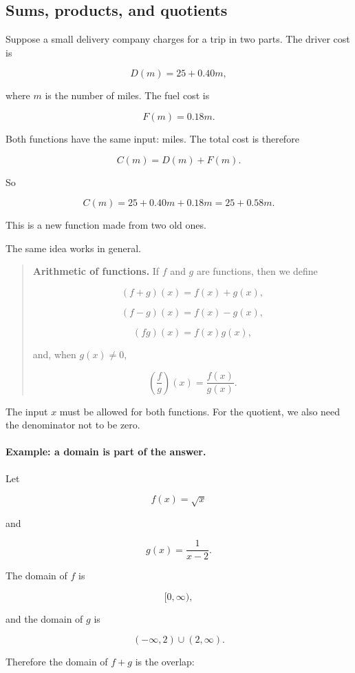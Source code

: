\subsection{Sums, products, and quotients}
\label{subsec:sums-products-quotients}

Suppose a small delivery company charges for a trip in two parts. The driver cost is

\[
D(m)=25+0.40m,
\]

where \(m\) is the number of miles. The fuel cost is

\[
F(m)=0.18m.
\]

Both functions have the same input: miles. The total cost is therefore

\[
C(m)=D(m)+F(m).
\]

So

\[
C(m)=25+0.40m+0.18m=25+0.58m.
\]

This is a new function made from two old ones.

The same idea works in general.

\begin{quote}
\textbf{Arithmetic of functions.}
If \(f\) and \(g\) are functions, then we define

\[
(f+g)(x)=f(x)+g(x),
\]

\[
(f-g)(x)=f(x)-g(x),
\]

\[
(fg)(x)=f(x)g(x),
\]

and, when \(g(x)\neq 0\),

\[
\left(\frac{f}{g}\right)(x)=\frac{f(x)}{g(x)}.
\]
\end{quote}

The input \(x\) must be allowed for both functions. For the quotient, we also need the denominator not to be zero.

\paragraph{Example: a domain is part of the answer.}
Let

\[
f(x)=\sqrt{x}
\]

and

\[
g(x)=\frac{1}{x-2}.
\]

The domain of \(f\) is

\[
[0,\infty),
\]

and the domain of \(g\) is

\[
(-\infty,2)\cup(2,\infty).
\]

Therefore the domain of \(f+g\) is the overlap:

